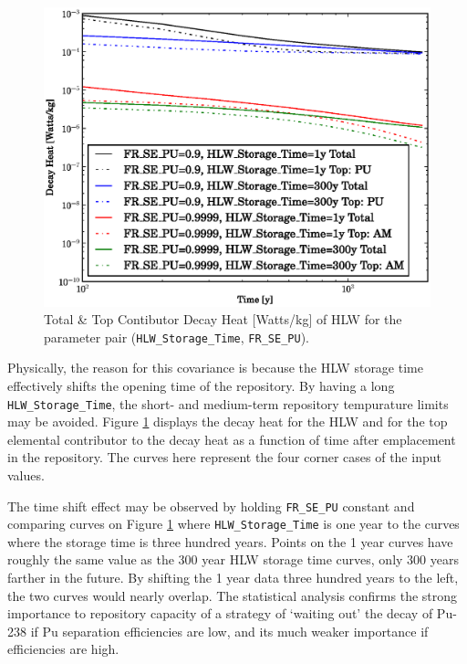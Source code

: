 \begin{figure}[htbp]
\begin{center}
\includegraphics[scale=0.70]{figs/FR_SE_PU_and_HLW_Storage_Time_Decay_Heat.eps}
\caption{Total \& Top Contibutor Decay Heat [Watts/kg] of HLW for the parameter pair (\texttt{HLW\_Storage\_Time}, \texttt{FR\_SE\_PU}).}
\label{hlw_pu_decay_heat}
\end{center}
\end{figure}

Physically, the reason for this covariance is because the HLW storage 
time effectively shifts the opening time of the repository.
By having a long \texttt{HLW\_Storage\_Time}, the short- and medium-term 
repository tempurature limits may be avoided.
Figure \ref{hlw_pu_decay_heat} displays the decay heat for the HLW and for 
the top elemental contributor to the decay heat as a
function of time after emplacement in the repository.  The curves here 
represent the four corner cases of the input values.

The time shift effect may be observed by holding \texttt{FR\_SE\_PU} constant 
and comparing curves on Figure \ref{hlw_pu_decay_heat}
where \texttt{HLW\_Storage\_Time} is one year to the curves where the storage 
time is three hundred years.  Points on the 1 year curves have
roughly the same value as the 300 year HLW storage time curves, only 300 years 
farther in the future.  By shifting the 1 year data
three hundred years to the left, the two curves would nearly overlap.  The 
statistical analysis confirms the strong importance to repository capacity 
of a strategy of `waiting out' the decay of Pu-238 if Pu separation efficiencies 
are low, and its much weaker importance if efficiencies are high.

